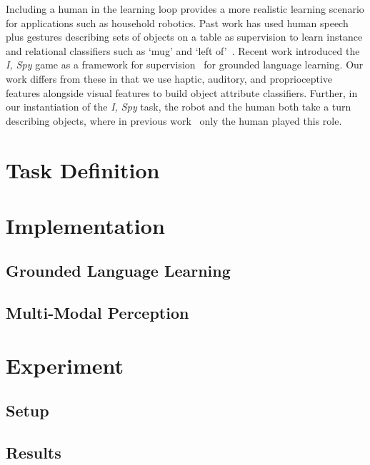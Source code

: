 \documentclass{article}
\newcommand{\ispy}{\textit{I, Spy} }
\begin{document}
	Including a human in the learning loop provides a more realistic learning scenario for applications such as household robotics. Past work has used human speech plus gestures describing sets of objects on a table as supervision to learn instance and relational classifiers such as `mug' and `left of'~\cite{kollar:rss13}. Recent work introduced the \ispy game as a framework for supervision~\cite{parde:ijcai15} for grounded language learning. Our work differs from these in that we use haptic, auditory, and proprioceptive features alongside visual features to build object attribute classifiers. Further, in our instantiation of the \ispy task, the robot and the human both take a turn describing objects, where in previous work~ only the human played this role.



\section{Task Definition}

\section{Implementation}

	\subsection{Grounded Language Learning}

	\subsection{Multi-Modal Perception}

\section{Experiment}

	\subsection{Setup}

	\subsection{Results}




\end{document}

